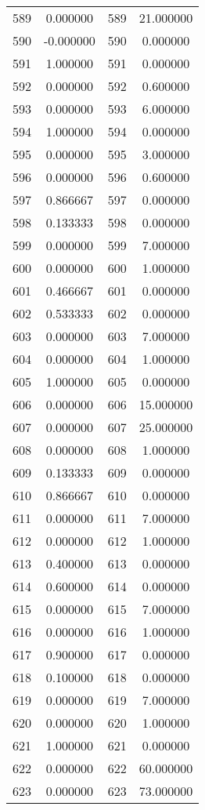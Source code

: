 \documentclass[12pt]{article}
\begin{document}
\begin{longtable}{@{}cccc@{}}
589 & 0.000000 & 589 & 21.000000 \\
590 & -0.000000 & 590 & 0.000000 \\
591 & 1.000000 & 591 & 0.000000 \\
592 & 0.000000 & 592 & 0.600000 \\
593 & 0.000000 & 593 & 6.000000 \\
594 & 1.000000 & 594 & 0.000000 \\
595 & 0.000000 & 595 & 3.000000 \\
596 & 0.000000 & 596 & 0.600000 \\
597 & 0.866667 & 597 & 0.000000 \\
598 & 0.133333 & 598 & 0.000000 \\
599 & 0.000000 & 599 & 7.000000 \\
600 & 0.000000 & 600 & 1.000000 \\
601 & 0.466667 & 601 & 0.000000 \\
602 & 0.533333 & 602 & 0.000000 \\
603 & 0.000000 & 603 & 7.000000 \\
604 & 0.000000 & 604 & 1.000000 \\
605 & 1.000000 & 605 & 0.000000 \\
606 & 0.000000 & 606 & 15.000000 \\
607 & 0.000000 & 607 & 25.000000 \\
608 & 0.000000 & 608 & 1.000000 \\
609 & 0.133333 & 609 & 0.000000 \\
610 & 0.866667 & 610 & 0.000000 \\
611 & 0.000000 & 611 & 7.000000 \\
612 & 0.000000 & 612 & 1.000000 \\
613 & 0.400000 & 613 & 0.000000 \\
614 & 0.600000 & 614 & 0.000000 \\
615 & 0.000000 & 615 & 7.000000 \\
616 & 0.000000 & 616 & 1.000000 \\
617 & 0.900000 & 617 & 0.000000 \\
618 & 0.100000 & 618 & 0.000000 \\
619 & 0.000000 & 619 & 7.000000 \\
620 & 0.000000 & 620 & 1.000000 \\
621 & 1.000000 & 621 & 0.000000 \\
622 & 0.000000 & 622 & 60.000000 \\
623 & 0.000000 & 623 & 73.000000 \\

\end{longtable}
\end{document}
